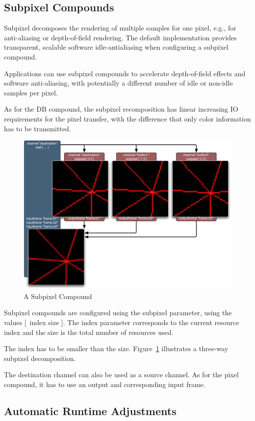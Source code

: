 \documentclass[10pt,a4]{scrartcl}
\newcommand{\fig}[1]{Figure~\ref{#1}}
\begin{document}
\subsection{\label{sSubpixel}Subpixel Compounds}

Subpixel decomposes the rendering of multiple samples for one pixel, e.g., for
anti-aliasing or depth-of-field rendering. The default implementation provides
transparent, scalable software idle-antialiasing when configuring a subpixel
compound.

Applications can use subpixel compounds to accelerate depth-of-field effects and
software anti-aliasing, with potentially a different number of idle or non-idle
samples per pixel.

As for the DB compound, the subpixel recomposition has linear increasing 
IO requirements for the pixel transfer, with the difference that only 
color information has to be transmitted.

\begin{figure}
  \includegraphics[width=.618\textwidth]{images/Subpixel.pdf}
  {\caption{\label{fSubpixel}\small A Subpixel Compound}}
\end{figure}
Subpixel compounds are configured using the \textsf{subpixel} parameter, using
the values \textsf{[~index size ]}. The \textsf{index} parameter corresponds to
the current resource index and the \textsf{size} is the total number of
resources used.

The \textsf{index} has to be smaller than the \textsf{size}. 
\fig{fSubpixel} illustrates a three-way subpixel decomposition.

The destination channel can also be used as a source channel. 
As for the pixel compound, it has to use an output and corresponding 
input frame.


\subsection{\label{sLoadBalancing}Automatic Runtime Adjustments}
\end{document}
